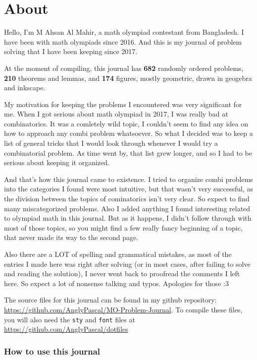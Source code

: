 \chapter*{About}  

\thispagestyle{empty}

Hello, I'm M Ahsan Al Mahir, a math olympiad contestant from Bangladesh. I have been with
math olympiads since 2016. And this is my journal of problem solving that I have been
keeping since 2017. 


At the moment of compiling, this journal has \textbf{682} randomly ordered problems,
\textbf{210} theorems and lemmas, and \textbf{174} figures, mostly geometric, drawn in
geogebra and inkscape.

My motivation for keeping the problems I encountered was very significant for me. When I
got serious about math olympiad in 2017, I was really bad at combinatorics. It was a
comletely wild topic, I couldn't seem to find any idea on how to approach any combi
problem whatsoever. So what I decided was to keep a list of general tricks that I would
look through whenever I would try a combinatorial problem. As time went by, that list grew
longer, and so I had to be serious about keeping it organized.

And that's how this journal came to existence. I tried to organize combi problems into the
categories I found were most intuitive, but that wasn't very successful, as the division
between the topics of cominatorics isn't very clear. So expect to find many miscategorized
problems. Also I added anything I found interesting related to olympiad math in this
journal. But as it happens, I didn't follow through with most of those topics, so you
might find a few really fancy beginning of a topic, that never made its way to the second
page.

Also there are a LOT of spelling and grammatical mistakes, as most of the entries I made
here was right after solving (or in most cases, after failing to solve and reading the
solution), I never went back to proofread the comments I left here. So expect a lot of
nonsense talking and typos. Apologies for those :3 

The source files for this journal can be found in my github repository:
\url{https://github.com/AnglyPascal/MO-Problem-Journal}. To compile these files, you will
also need the \texttt{sty} and \texttt{font} files at
\url{https://github.com/AnglyPascal/dotfiles}

\subsection*{How to use this journal}

